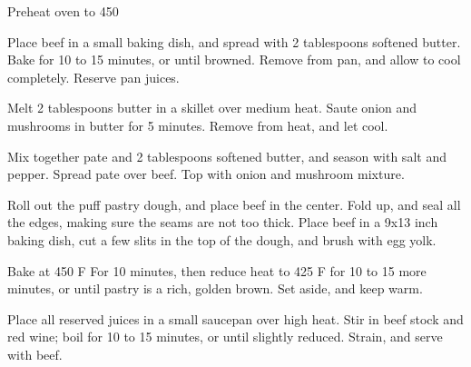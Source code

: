 Preheat oven to 450 \degree 

Place beef in a small baking dish, and spread with 2 tablespoons softened butter. Bake for 10 to 15 minutes, or until browned. 
Remove from pan, and allow to cool completely. Reserve pan juices.

Melt 2 tablespoons butter in a skillet over medium heat. Saute onion and mushrooms in butter for 5 minutes. Remove from heat, and let cool.

Mix together pate and 2 tablespoons softened butter, and season with salt and pepper. Spread pate over beef. Top with onion and mushroom mixture.

Roll out the puff pastry dough, and place beef in the center. Fold up, and seal all the edges, making sure the seams are not too thick. 
Place beef in a 9x13 inch baking dish, cut a few slits in the top of the dough, and brush with egg yolk.

Bake at 450 \degree F For 10 minutes, then reduce heat to 425 \degree F for 10 to 15 more minutes, or until pastry is a rich, golden brown. Set aside, and keep warm.

Place all reserved juices in a small saucepan over high heat. Stir in beef stock and red wine; boil for 10 to 15 minutes, or until slightly reduced. Strain, and serve with beef.
